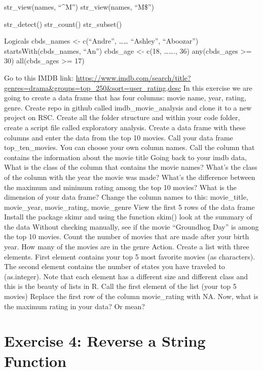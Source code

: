 \documentclass[]{book}
\begin{document}
str\_view(names, ``\^{}M'')
str\_view(names, ``M\$'')

str\_detect()
str\_count()
str\_subset()

Logicals
cbds\_names \textless{}- c(``Andre'', \ldots{}\ldots{} ``Ashley'', ``Aboozar'')
startsWith(cbds\_names, ``An'')
cbds\_age \textless{}- c(18, \ldots{}\ldots{}., 36)
any(cbds\_ages \textgreater{}= 30)
all(cbds\_ages \textgreater{}= 17)

Go to this IMDB link: \url{https://www.imdb.com/search/title?genres=drama\&groups=top_250\&sort=user_rating,desc}
In this exercise we are going to create a data frame that has four columns: movie name, year, rating, genre. Create repo in github called imdb\_movie\_analysis and clone it to a new project on RSC. Create all the folder structure and within your code folder, create a script file called exploratory analysis. Create a data frame with these columns and enter the data from the top 10 movies. Call your data frame top\_ten\_movies. You can choose your own column names.
Call the column that contains the information about the movie title
Going back to your imdb data, What is the class of the column that contains the movie names?
What's the class of the column with the year the movie was made?
What's the difference between the maximum and minimum rating among the top 10 movies?
What is the dimension of your data frame?
Change the column names to this: movie\_title, movie\_year, movie\_rating, movie\_genre
View the first 5 rows of the data frame
Install the package skimr and using the function skim() look at the summary of the data
Without checking manually, see if the movie ``Groundhog Day'' is among the top 10 movies.
Count the number of movies that are made after your birth year.
How many of the movies are in the genre Action.
Create a list with three elements. First element contains your top 5 most favorite movies (as characters). The second element contains the number of states you have traveled to (as.integer). Note that each element has a different size and different class and this is the beauty of lists in R.
Call the first element of the list (your top 5 movies)
Replace the first row of the column movie\_rating with NA. Now, what is the maximum rating in your data? Or mean?

\hypertarget{exercise-4-reverse-a-string-function}{%
\section*{Exercise 4: Reverse a String Function}\label{exercise-4-reverse-a-string-function}}
\end{document}

